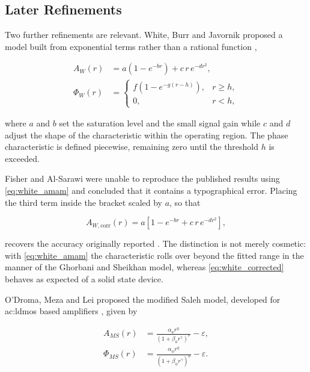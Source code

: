 \subsection{Later Refinements}\label{sec:later_pa_models}

Two further refinements are relevant. White, Burr and Javornik proposed a model built from exponential terms rather than a rational function \cite{white},

\begin{align}
  A_W(r)    &= a\left(1 - e^{-br}\right) + c\,r\,e^{-dr^2}, \label{eq:white_amam} \\
  \Phi_W(r) &= \begin{cases}
                 f\left(1 - e^{-g(r-h)}\right), & r \geq h, \\
                 0,                              & r < h,
               \end{cases} \label{eq:white_ampm}
\end{align}

where $a$ and $b$ set the saturation level and the small signal gain while $c$ and $d$ adjust the shape of the characteristic within the operating region. The phase characteristic is defined piecewise, remaining zero until the threshold $h$ is exceeded.

Fisher and Al-Sarawi were unable to reproduce the published results using \eqref{eq:white_amam} and concluded that it contains a typographical error. Placing the third term inside the bracket scaled by $a$, so that

\begin{equation}
  A_{W,\text{corr}}(r) = a\left[1 - e^{-br} + c\,r\,e^{-dr^2}\right],
  \label{eq:white_corrected}
\end{equation}

recovers the accuracy originally reported \cite{fisher}. The distinction is not merely cosmetic: with \eqref{eq:white_amam} the characteristic rolls over beyond the fitted range in the manner of the Ghorbani and Sheikhan model, whereas \eqref{eq:white_corrected} behaves as expected of a solid state device. 

O'Droma, Meza and Lei proposed the modified Saleh model, developed for \gls{ac:ldmos} based amplifiers \cite{odroma}, given by

\begin{align}
  A_{MS}(r)    &= \frac{\alpha_a r^{\eta}}{\left(1 + \beta_a r^{\gamma}\right)^{\nu}} - \varepsilon,
                  \label{eq:modsaleh_amam} \\
  \Phi_{MS}(r) &= \frac{\alpha_\phi r^{\eta}}{\left(1 + \beta_\phi r^{\gamma}\right)^{\nu}} - \varepsilon.
                  \label{eq:modsaleh_ampm}
\end{align}

